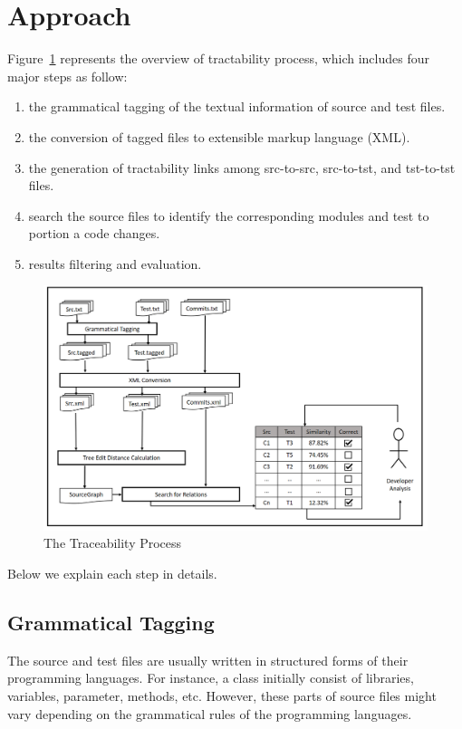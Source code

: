 
\section{Approach}
\label{sec:method}

Figure~\ref{fig:overview} represents the overview of 
tractability process, which includes four major steps
as follow:
\begin{enumerate}
	\item the grammatical tagging of the textual information of
	source and test files.
	\item the conversion of tagged files to 
	extensible markup language (XML).
	\item the generation of tractability links among 
	src-to-src, src-to-tst, and tst-to-tst files.
	\item search the source files to identify the
	 corresponding modules and test to portion a code changes.
	\item results filtering and evaluation. 
\end{enumerate}


\begin{figure}[!ht]
	\centering
	\includegraphics[width=0.95\linewidth]{./overview3.png}
	\vspace*{-10pt}
	\caption{The Traceability Process}
	\label{fig:overview}
\end{figure}

Below we explain each step in details.


\subsection{Grammatical Tagging}
The source and test files are usually 
written in structured forms of their programming 
languages.  For instance, a class initially 
consist of libraries, variables, parameter, methods, etc. 
However, these parts of source files might vary 
depending on the grammatical rules of the programming languages.

